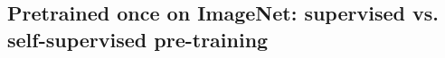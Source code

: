 \documentclass[a4paper,fleqn]{cas-dc}
\begin{document}




\subsection{Pretrained once on ImageNet: supervised vs. self-supervised pre-training}
\label{sec:isic_result_base}

\end{document}
